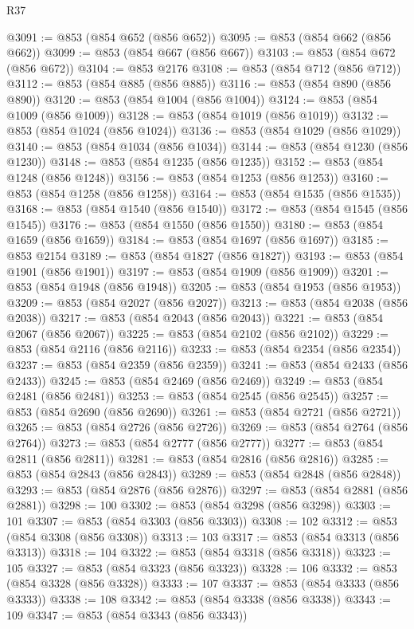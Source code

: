 \begin{lexlean}{R37}
\begin{coremodule}
@3091 := @853 (@854 @652 (@856 @652))
@3095 := @853 (@854 @662 (@856 @662))
@3099 := @853 (@854 @667 (@856 @667))
@3103 := @853 (@854 @672 (@856 @672))
@3104 := @853 @2176
@3108 := @853 (@854 @712 (@856 @712))
@3112 := @853 (@854 @885 (@856 @885))
@3116 := @853 (@854 @890 (@856 @890))
@3120 := @853 (@854 @1004 (@856 @1004))
@3124 := @853 (@854 @1009 (@856 @1009))
@3128 := @853 (@854 @1019 (@856 @1019))
@3132 := @853 (@854 @1024 (@856 @1024))
@3136 := @853 (@854 @1029 (@856 @1029))
@3140 := @853 (@854 @1034 (@856 @1034))
@3144 := @853 (@854 @1230 (@856 @1230))
@3148 := @853 (@854 @1235 (@856 @1235))
@3152 := @853 (@854 @1248 (@856 @1248))
@3156 := @853 (@854 @1253 (@856 @1253))
@3160 := @853 (@854 @1258 (@856 @1258))
@3164 := @853 (@854 @1535 (@856 @1535))
@3168 := @853 (@854 @1540 (@856 @1540))
@3172 := @853 (@854 @1545 (@856 @1545))
@3176 := @853 (@854 @1550 (@856 @1550))
@3180 := @853 (@854 @1659 (@856 @1659))
@3184 := @853 (@854 @1697 (@856 @1697))
@3185 := @853 @2154
@3189 := @853 (@854 @1827 (@856 @1827))
@3193 := @853 (@854 @1901 (@856 @1901))
@3197 := @853 (@854 @1909 (@856 @1909))
@3201 := @853 (@854 @1948 (@856 @1948))
@3205 := @853 (@854 @1953 (@856 @1953))
@3209 := @853 (@854 @2027 (@856 @2027))
@3213 := @853 (@854 @2038 (@856 @2038))
@3217 := @853 (@854 @2043 (@856 @2043))
@3221 := @853 (@854 @2067 (@856 @2067))
@3225 := @853 (@854 @2102 (@856 @2102))
@3229 := @853 (@854 @2116 (@856 @2116))
@3233 := @853 (@854 @2354 (@856 @2354))
@3237 := @853 (@854 @2359 (@856 @2359))
@3241 := @853 (@854 @2433 (@856 @2433))
@3245 := @853 (@854 @2469 (@856 @2469))
@3249 := @853 (@854 @2481 (@856 @2481))
@3253 := @853 (@854 @2545 (@856 @2545))
@3257 := @853 (@854 @2690 (@856 @2690))
@3261 := @853 (@854 @2721 (@856 @2721))
@3265 := @853 (@854 @2726 (@856 @2726))
@3269 := @853 (@854 @2764 (@856 @2764))
@3273 := @853 (@854 @2777 (@856 @2777))
@3277 := @853 (@854 @2811 (@856 @2811))
@3281 := @853 (@854 @2816 (@856 @2816))
@3285 := @853 (@854 @2843 (@856 @2843))
@3289 := @853 (@854 @2848 (@856 @2848))
@3293 := @853 (@854 @2876 (@856 @2876))
@3297 := @853 (@854 @2881 (@856 @2881))
@3298 := 100
@3302 := @853 (@854 @3298 (@856 @3298))
@3303 := 101
@3307 := @853 (@854 @3303 (@856 @3303))
@3308 := 102
@3312 := @853 (@854 @3308 (@856 @3308))
@3313 := 103
@3317 := @853 (@854 @3313 (@856 @3313))
@3318 := 104
@3322 := @853 (@854 @3318 (@856 @3318))
@3323 := 105
@3327 := @853 (@854 @3323 (@856 @3323))
@3328 := 106
@3332 := @853 (@854 @3328 (@856 @3328))
@3333 := 107
@3337 := @853 (@854 @3333 (@856 @3333))
@3338 := 108
@3342 := @853 (@854 @3338 (@856 @3338))
@3343 := 109
@3347 := @853 (@854 @3343 (@856 @3343))

\end{coremodule}
\end{lexlean}
